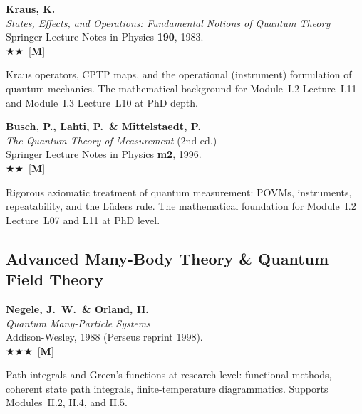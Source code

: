 \documentclass[11pt,a4paper]{article}
\newcommand{\essential}{$\bigstar\bigstar\bigstar$}
\newcommand{\recommended}{$\bigstar\bigstar$}
\newenvironment{bibentry}[1]{\begin{tcolorbox}[entrybox=#1,top=4pt,bottom=4pt]}{\end{tcolorbox}\smallskip}
\begin{document}
\begin{bibentry}{t5light}
\textbf{Kraus, K.}\\
\textit{States, Effects, and Operations: Fundamental Notions of Quantum Theory}\\
Springer Lecture Notes in Physics \textbf{190}, 1983.\\[3pt]
\recommended\ [\textbf{M}]\\[3pt]
\begin{tcolorbox}[annotbox]
Kraus operators, CPTP maps, and the operational (instrument) formulation of
quantum mechanics. The mathematical background for Module~I.2 Lecture~L11 and
Module~I.3 Lecture~L10 at PhD depth.
\end{tcolorbox}
\end{bibentry}

\begin{bibentry}{t5light}
\textbf{Busch, P., Lahti, P.\ \& Mittelstaedt, P.}\\
\textit{The Quantum Theory of Measurement} (2nd ed.)\\
Springer Lecture Notes in Physics \textbf{m2}, 1996.\\[3pt]
\recommended\ [\textbf{M}]\\[3pt]
\begin{tcolorbox}[annotbox]
Rigorous axiomatic treatment of quantum measurement: POVMs, instruments, repeatability,
and the L\"uders rule. The mathematical foundation for Module~I.2 Lecture~L07 and L11
at PhD level.
\end{tcolorbox}
\end{bibentry}

\subsection{Advanced Many-Body Theory \& Quantum Field Theory}

\begin{bibentry}{t5light}
\textbf{Negele, J.~W.\ \& Orland, H.}\\
\textit{Quantum Many-Particle Systems}\\
Addison-Wesley, 1988 (Perseus reprint 1998).\\[3pt]
\essential\ [\textbf{M}]\\[3pt]
\begin{tcolorbox}[annotbox]
Path integrals and Green's functions at research level: functional methods,
coherent state path integrals, finite-temperature diagrammatics. Supports
Modules~II.2, II.4, and II.5.
\end{tcolorbox}
\end{bibentry}
\end{document}
